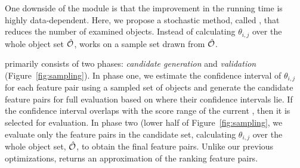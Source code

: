 One downside of the \earlyT module
is that the improvement in the running time is highly data-dependent.
Here, we propose a stochastic method, called \sampling,
that reduces the number of examined objects.
Instead of calculating $\theta_{i,j}$ over the
whole object set $\hat{{\mathcal{O}}}$, \sampling works on a
sample set drawn from $\hat{{\mathcal{O}}}$.

 \sampling primarily consists of two phases: {\em candidate generation} and {\em validation}
(Figure~\ref{fig:sampling}).
In phase one, we estimate the confidence interval of $\theta_{i,j}$
for each feature pair using a sampled set of objects and
generate the candidate feature pairs for full evaluation
based on where their confidence intervals lie.
If the confidence interval overlaps with the
score range of the current \topk, then it is selected for evaluation.
In phase two (lower half of Figure~\ref{fig:sampling},
we evaluate only the feature pairs in the candidate set,
calculating $\theta_{i,j}$ over the whole object set, $\hat{{\mathcal{O}}}$,
to obtain the final \topk feature pairs.
Unlike our previous optimizations, \sampling returns
an approximation of the \topk ranking feature pairs.



